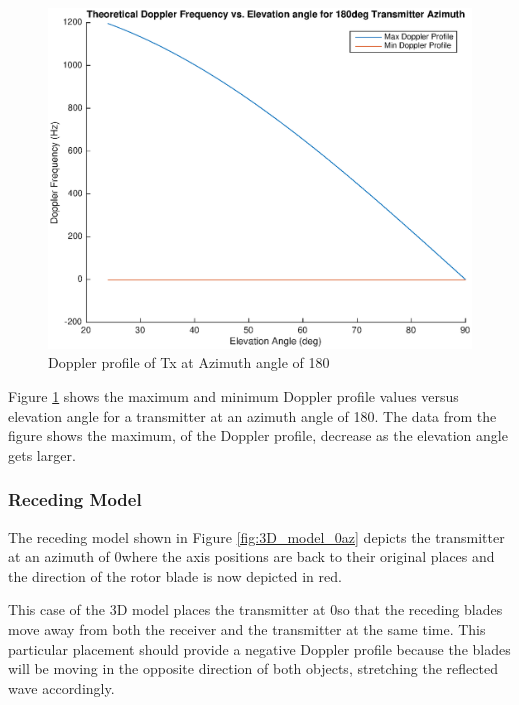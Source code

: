\begin{figure}
	\begin{center}
		\includegraphics[width=15cm]{images/background/3d_geometry_tx_180az_doppler_profile.eps}
		\caption{Doppler profile of Tx at Azimuth angle of 180\textdegree}
		\label{fig:3D_model_180az_doppler}
	\end{center}
\end{figure}

Figure \ref{fig:3D_model_180az_doppler} shows the maximum and minimum Doppler profile values versus elevation angle for a transmitter at an azimuth angle of 180\textdegree. The data from the figure shows the maximum, of the Doppler profile, decrease as the elevation angle gets larger.

\subsubsection{Receding Model}
The receding model shown in Figure \ref{fig:3D_model_0az} depicts the transmitter at an azimuth of 0\textdegree \space where the axis positions are back to their original places and the direction of the rotor blade is now depicted in red.

This case of the 3D model places the transmitter at 0\textdegree \space so that the receding blades move away from both the receiver and the transmitter at the same time. This particular placement should provide a negative Doppler profile because the blades will be moving in the opposite direction of both objects, stretching the reflected wave accordingly.


